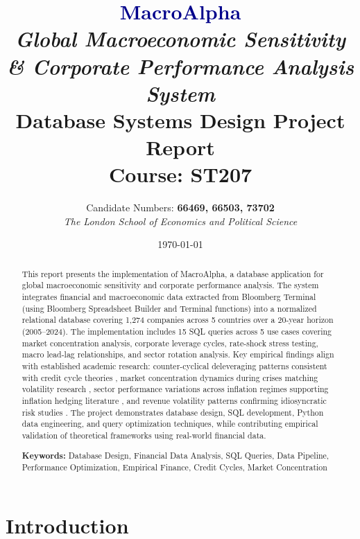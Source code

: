\documentclass[10pt,a4paper]{article}
\title{
    \textcolor{darkblue}{\textbf{MacroAlpha}} \\
    \large \textit{Global Macroeconomic Sensitivity \& Corporate Performance Analysis System} \\
    \vspace{0.5cm}
    \normalsize Database Systems Design Project Report \\
    Course: ST207
}
\author{
    Candidate Numbers: \textbf{66469, 66503, 73702} \\
    \vspace{0.1cm}
    \small \textit{The London School of Economics and Political Science}
}
\date{\today}
\begin{document}
\maketitle
\thispagestyle{empty}
\newpage

\begin{abstract}
This report presents the implementation of MacroAlpha, a database application for global macroeconomic sensitivity and corporate performance analysis. The system integrates financial and macroeconomic data extracted from Bloomberg Terminal (using Bloomberg Spreadsheet Builder and Terminal functions) into a normalized relational database covering 1,274 companies across 5 countries over a 20-year horizon (2005--2024). The implementation includes 15 SQL queries across 5 use cases covering market concentration analysis, corporate leverage cycles, rate-shock stress testing, macro lead-lag relationships, and sector rotation analysis. Key empirical findings align with established academic research: counter-cyclical deleveraging patterns consistent with credit cycle theories \cite{kiyotaki1997,bernanke1999}, market concentration dynamics during crises matching volatility research \cite{schwert1989,shiller1981}, sector performance variations across inflation regimes supporting inflation hedging literature \cite{bekaert2010}, and revenue volatility patterns confirming idiosyncratic risk studies \cite{campbell2001}. The project demonstrates database design, SQL development, Python data engineering, and query optimization techniques, while contributing empirical validation of theoretical frameworks using real-world financial data.

\textbf{Keywords:} Database Design, Financial Data Analysis, SQL Queries, Data Pipeline, Performance Optimization, Empirical Finance, Credit Cycles, Market Concentration
\end{abstract}

\small



\section{Introduction}
\end{document}
